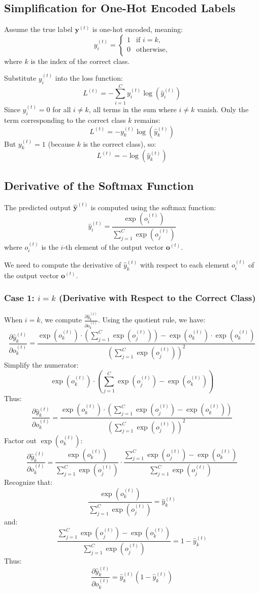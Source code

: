 \begin{notechapter}
\subsection{Simplification for One-Hot Encoded Labels}
Assume the true label \(\mathbf{y}^{(t)}\) is one-hot encoded, meaning:
\[
y_i^{(t)} = 
\begin{cases}
1 & \text{if } i = k, \\
0 & \text{otherwise},
\end{cases}
\]
where \( k \) is the index of the correct class.

Substitute \( y_i^{(t)} \) into the loss function:
\[
L^{(t)} = -\sum_{i=1}^C y_i^{(t)} \log(\hat{y}_i^{(t)})
\]
Since \( y_i^{(t)} = 0 \) for all \( i \neq k \), all terms in the sum where 
\( i \neq k \) vanish. Only the term corresponding to the correct class \( k \) 
remains:
\[
L^{(t)} = -y_k^{(t)} \log(\hat{y}_k^{(t)})
\]
But \( y_k^{(t)} = 1 \) (because \( k \) is the correct class), so:
\[
L^{(t)} = -\log(\hat{y}_k^{(t)})
\]

\subsection{Derivative of the Softmax Function}
The predicted output \(\hat{\mathbf{y}}^{(t)}\) is computed using the softmax 
function:
\[
\hat{y}_i^{(t)} = \frac{\exp(o_i^{(t)})}{\sum_{j=1}^C \exp(o_j^{(t)})}
\]
where \( o_i^{(t)} \) is the \( i \)-th element of the output vector \(\mathbf{o}^{(t)}\).

We need to compute the derivative of \(\hat{y}_k^{(t)}\) with respect to each 
element \(o_i^{(t)}\) of the output vector \(\mathbf{o}^{(t)}\).

\subsubsection{Case 1: \(i = k\) (Derivative with Respect to the Correct Class)}
When \(i = k\), we compute \(\frac{\partial \hat{y}_k^{(t)}}{\partial o_k^{(t)}}\). 
Using the quotient rule, we have:
\[
\frac{\partial \hat{y}_k^{(t)}}{\partial o_k^{(t)}} = 
\frac{\exp(o_k^{(t)}) \cdot \left( \sum_{j=1}^C \exp(o_j^{(t)}) \right) - \exp(o_k^{(t)}) \cdot \exp(o_k^{(t)})}{\left( \sum_{j=1}^C \exp(o_j^{(t)}) \right)^2}
\]
Simplify the numerator:
\[
\exp(o_k^{(t)}) \cdot \left( \sum_{j=1}^C \exp(o_j^{(t)}) - \exp(o_k^{(t)}) \right)
\]
Thus:
\[
\frac{\partial \hat{y}_k^{(t)}}{\partial o_k^{(t)}} = 
\frac{\exp(o_k^{(t)}) \cdot \left( \sum_{j=1}^C \exp(o_j^{(t)}) - \exp(o_k^{(t)}) \right)}{\left( \sum_{j=1}^C \exp(o_j^{(t)}) \right)^2}
\]
Factor out \(\exp(o_k^{(t)})\):
\[
\frac{\partial \hat{y}_k^{(t)}}{\partial o_k^{(t)}} = 
\frac{\exp(o_k^{(t)})}{\sum_{j=1}^C \exp(o_j^{(t)})} \cdot 
\frac{\sum_{j=1}^C \exp(o_j^{(t)}) - \exp(o_k^{(t)})}{\sum_{j=1}^C \exp(o_j^{(t)})}
\]
Recognize that:
\[
\frac{\exp(o_k^{(t)})}{\sum_{j=1}^C \exp(o_j^{(t)})} = \hat{y}_k^{(t)}
\]
and:
\[
\frac{\sum_{j=1}^C \exp(o_j^{(t)}) - \exp(o_k^{(t)})}{\sum_{j=1}^C \exp(o_j^{(t)})} = 1 - \hat{y}_k^{(t)}
\]
Thus:
\[
\frac{\partial \hat{y}_k^{(t)}}{\partial o_k^{(t)}} = \hat{y}_k^{(t)} (1 - \hat{y}_k^{(t)})
\]


\end{notechapter}
